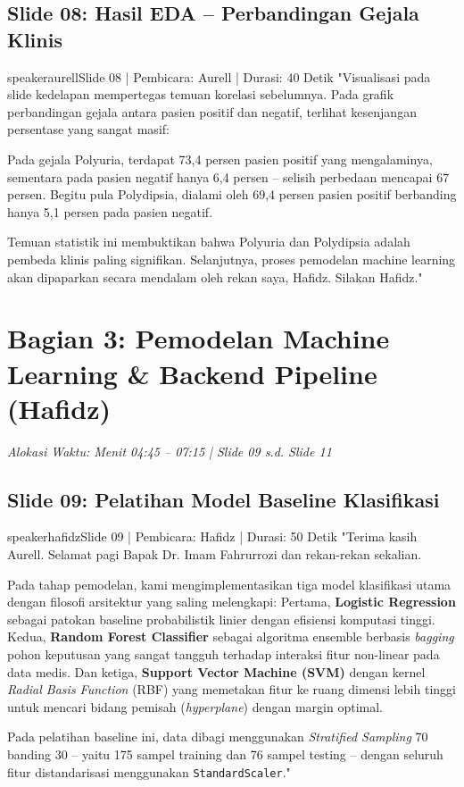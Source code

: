 \documentclass[11pt,a4paper]{article}
\begin{document}
\subsection{Slide 08: Hasil EDA -- Perbandingan Gejala Klinis}
\begin{scriptbox}{speakeraurell}{Slide 08 | Pembicara: Aurell | Durasi: 40 Detik}
"Visualisasi pada slide kedelapan mempertegas temuan korelasi sebelumnya. Pada grafik perbandingan gejala antara pasien positif dan negatif, terlihat kesenjangan persentase yang sangat masif:

Pada gejala Polyuria, terdapat 73,4 persen pasien positif yang mengalaminya, sementara pada pasien negatif hanya 6,4 persen -- selisih perbedaan mencapai 67 persen.
Begitu pula Polydipsia, dialami oleh 69,4 persen pasien positif berbanding hanya 5,1 persen pada pasien negatif.

Temuan statistik ini membuktikan bahwa Polyuria dan Polydipsia adalah pembeda klinis paling signifikan. Selanjutnya, proses pemodelan machine learning akan dipaparkan secara mendalam oleh rekan saya, Hafidz. Silakan Hafidz."
\end{scriptbox}

\newpage

\section{Bagian 3: Pemodelan Machine Learning \& Backend Pipeline (Hafidz)}
\textit{Alokasi Waktu: Menit 04:45 -- 07:15 | Slide 09 s.d. Slide 11}

\subsection{Slide 09: Pelatihan Model Baseline Klasifikasi}
\begin{scriptbox}{speakerhafidz}{Slide 09 | Pembicara: Hafidz | Durasi: 50 Detik}
"Terima kasih Aurell. Selamat pagi Bapak Dr. Imam Fahrurrozi dan rekan-rekan sekalian.

Pada tahap pemodelan, kami mengimplementasikan tiga model klasifikasi utama dengan filosofi arsitektur yang saling melengkapi:
Pertama, \textbf{Logistic Regression} sebagai patokan baseline probabilistik linier dengan efisiensi komputasi tinggi.
Kedua, \textbf{Random Forest Classifier} sebagai algoritma ensemble berbasis \textit{bagging} pohon keputusan yang sangat tangguh terhadap interaksi fitur non-linear pada data medis.
Dan ketiga, \textbf{Support Vector Machine (SVM)} dengan kernel \textit{Radial Basis Function} (RBF) yang memetakan fitur ke ruang dimensi lebih tinggi untuk mencari bidang pemisah (\textit{hyperplane}) dengan margin optimal.

Pada pelatihan baseline ini, data dibagi menggunakan \textit{Stratified Sampling} 70 banding 30 -- yaitu 175 sampel training dan 76 sampel testing -- dengan seluruh fitur distandarisasi menggunakan \texttt{StandardScaler}."
\end{scriptbox}
\end{document}
